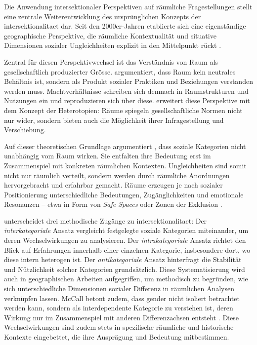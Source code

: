 \vspace{2em}

Die Anwendung intersektionaler Perspektiven auf räumliche Fragestellungen stellt eine zentrale Weiterentwicklung des ursprünglichen Konzepts der \gls{intersektionalitaet} dar. Seit den 2000er-Jahren etablierte sich eine eigenständige geographische Perspektive, die räumliche Kontextualität und situative Dimensionen sozialer Ungleichheiten explizit in den Mittelpunkt rückt \parencite{valentineTheorizingResearchingIntersectionality2007,rodo-de-zarateIntersectionalityFeministGeographies2018}.

Zentral für diesen Perspektivwechsel ist das Verständnis von Raum als gesellschaftlich produzierter Grösse. \textcite{lefebvreProductionLespace1974} argumentiert, dass Raum kein neutrales Behältnis ist, sondern als Produkt sozialer Praktiken und Beziehungen verstanden werden muss. Machtverhältnisse schreiben sich demnach in Raumstrukturen und Nutzungen ein und reproduzieren sich über diese. \textcite{foucaultEspacesAutres2004} erweitert diese Perspektive mit dem Konzept der Heterotopien: Räume spiegeln gesellschaftliche Normen nicht nur wider, sondern bieten auch die Möglichkeit ihrer Infragestellung und Verschiebung.

Auf dieser theoretischen Grundlage argumentiert \textcite{valentineTheorizingResearchingIntersectionality2007}, dass soziale Kategorien nicht unabhängig vom Raum wirken. Sie entfalten ihre Bedeutung erst im Zusammenspiel mit konkreten räumlichen Kontexten. Ungleichheiten sind somit nicht nur räumlich verteilt, sondern werden durch räumliche Anordnungen hervorgebracht und erfahrbar gemacht. Räume erzeugen je nach sozialer Positionierung unterschiedliche Bedeutungen, Zugänglichkeiten und emotionale Resonanzen -- etwa in Form von \textit{Safe Spaces} oder Zonen der Exklusion \parencite[\gls{vgl}][]{rodo-de-zarateIntersectionalityFeministGeographies2018}.

\textcite{mccallComplexityIntersectionality2005} unterscheidet drei methodische Zugänge zu \gls{intersektionalitaet}: Der \emph{interkategoriale} Ansatz vergleicht festgelegte soziale Kategorien miteinander, um deren Wechselwirkungen zu analysieren. Der \emph{intrakategoriale} Ansatz richtet den Blick auf Erfahrungen innerhalb einer einzelnen Kategorie, insbesondere dort, wo diese intern heterogen ist. Der \emph{antikategoriale} Ansatz hinterfragt die Stabilität und Nützlichkeit solcher Kategorien grundsätzlich. Diese Systematisierung wird auch in geographischen Arbeiten aufgegriffen, um methodisch zu begründen, wie sich unterschiedliche Dimensionen sozialer Differenz in räumlichen Analysen verknüpfen lassen. McCall betont zudem, dass \gls{gender} nicht isoliert betrachtet werden kann, sondern als interdependente Kategorie zu verstehen ist, deren Wirkung nur im Zusammenspiel mit anderen Differenzachsen entsteht \parencite{mccallSpatialRoutesGender1998}. Diese Wechselwirkungen sind zudem stets in spezifische räumliche und historische Kontexte eingebettet, die ihre Ausprägung und Bedeutung mitbestimmen.

